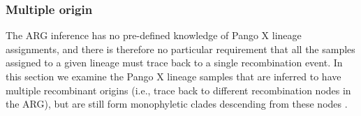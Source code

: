 \documentclass{article}
\begin{document}
\subsubsection{Multiple origin}
The ARG inference has no pre-defined knowledge of Pango X lineage assignments,
and there is therefore no particular requirement that all the samples
assigned to a given lineage must trace back to a single recombination
event. In this section we examine the Pango X lineage samples that
are inferred to have multiple recombinant origins (i.e., trace
back to different recombination nodes in the ARG), but are still
form monophyletic clades %
descending from these nodes .

\end{document}
